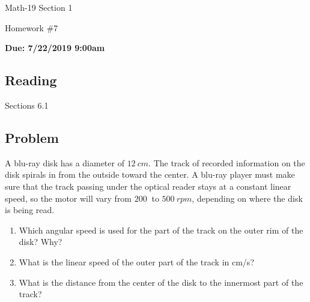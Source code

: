 \documentclass[letterpaper,12pt,fleqn]{article}
\begin{document}
\begin{center}
  \large
  Math-19 Section 1

  \Large
  Homework \#7

  \large
  \textbf{Due: 7/22/2019 9:00am}
\end{center}

\subsection*{Reading}

Sections 6.1

\subsection*{Problem}

A blu-ray disk has a diameter of $\SI{12}{cm}$.  The track of recorded information on the disk spirals in from the
outside toward the center.  A blu-ray player must make sure that the track passing under the optical reader stays
at a constant linear speed, so the motor will vary from $\SI{200}{}$ to $\SI{500}{rpm}$, depending on where the
disk is being read.
\begin{enumerate}
\item Which angular speed is used for the part of the track on the outer rim of the disk? Why?
\item What is the linear speed of the outer part of the track in cm/s?
\item What is the distance from the center of the disk to the innermost part of the track?
\end{enumerate}
\end{document}
